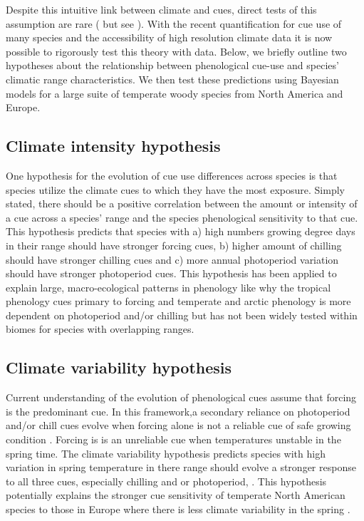 \documentclass[12pt]{article}\usepackage[]{graphicx}\usepackage[]{color}
\begin{document}
Despite this intuitive link between climate and cues, direct tests of this assumption are rare ( but see \citep{Zohner:2017aa}). With the recent quantification for cue use of many species \citep{Ettinger:2020aa} and the accessibility of high resolution climate data it is now possible to rigorously test this theory with data. Below, we briefly outline two hypotheses about the relationship between phenological cue-use and species' climatic range characteristics. We then test these predictions using Bayesian models for a large suite of temperate woody species from North America and Europe.

\subsection{Climate intensity hypothesis}
One hypothesis for the evolution of cue use differences across species is that species utilize the climate cues to which they have the most exposure. Simply stated, there should be a positive correlation between the amount or intensity of a cue across a species' range and the species phenological sensitivity to that cue. This hypothesis predicts that species with  a) high numbers growing degree days in their range should have stronger forcing cues, b) higher amount of chilling should have stronger chilling cues and c) more annual photoperiod variation should have stronger photoperiod cues. This hypothesis has been applied to explain large, macro-ecological patterns in phenology like why the tropical phenology cues primary to forcing and temperate and arctic phenology is more dependent on photoperiod and/or chilling \citep{} but has not been widely tested within biomes for species with overlapping ranges.  

\subsection{Climate variability hypothesis}

Current understanding of the evolution of phenological cues assume that forcing is the predominant cue. In this framework,a secondary reliance on photoperiod and/or chill cues evolve when forcing alone is not a reliable cue of safe growing condition \citep{Korner:2010aa}. Forcing is is an unreliable cue when temperatures unstable in the spring time. The climate variability hypothesis predicts species with high variation in spring temperature in there range should evolve a stronger response to all three cues, especially chilling and or photoperiod,  \citep{Wang:2014aa, Muffler2016}. This hypothesis potentially explains the stronger cue sensitivity of temperate North American species to those in Europe where there is less climate variability in the spring \citep{Zohner}.
\end{document}
